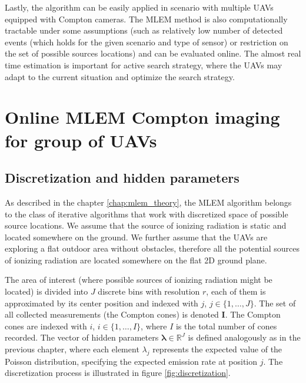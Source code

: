 Lastly, the algorithm can be easily applied in scenario with multiple \ac{UAV}s equipped with Compton cameras.
The \ac{MLEM} method is also computationally tractable under some assumptions 
(such as relatively low number of detected events (which holds for the given scenario and type of sensor) or restriction on the set of possible sources locations)
and can be evaluated online.
The almost real time estimation is important for active search strategy, where the \ac{UAV}s may adapt to the current situation and optimize the search strategy.

\section{Online MLEM Compton imaging for group of \ac{UAV}s}
\label{sec:setup}
\subsection{Discretization and hidden parameters}
As described in the chapter \ref{chap:mlem_theory}, the \ac{MLEM} algorithm belongs to the class of iterative algorithms that work with discretized space of possible source locations.
We assume that the source of ionizing radiation is static and located somewhere on the ground.
We further assume that the \ac{UAV}s are exploring a flat outdoor area without obstacles, therefore all the potential sources of ionizing radiation are located somewhere on the flat 2D ground plane.

The area of interest (where possible sources of ionizing radiation might be located) is divided into $J$ discrete bins with resolution $r$, each of them is approximated by its center position and indexed with $j$, $j \in \{1, \dots , J\}$.
The set of all collected measurements (the Compton cones) is denoted $\mathbf{I}$.
The Compton cones are indexed with $i$, $i \in \{1, \dots, I\}$, where $I$ is the total number of cones recorded.
The vector of hidden parameters $\bm{\lambda}\in \mathbb{R}^{J}$ is defined analogously as in the previous chapter, where each element $\lambda_{j}$ represents the expected value of the Poisson distribution, specifying the expected emission rate at position $j$.
The discretization process is illustrated in figure \ref{fig:discretization}.

